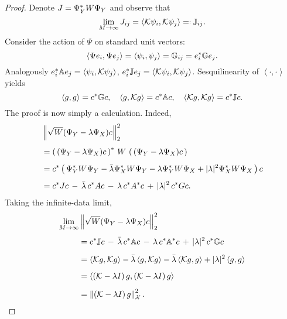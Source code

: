 \begin{proof}
    Denote $J = \Psi_Y^* W \Psi_Y$ and observe that
    \begin{equation}
        \label{eq:J}
        \lim_{M \to \infty} J_{i j} = 
        \left\langle \scrK \psi_i, \scrK \psi_j \right\rangle \eqdef \bbJ_{i j} . 
    \end{equation}
    Consider the action of $\Psi$ on standard unit vectors:
    \begin{equation}
        \left\langle \Psi e_i, \Psi e_j \right\rangle 
        = \left\langle \psi_i, \psi_j \right\rangle 
        = \mathbb{G}_{i j} 
        = e_i^* \mathbb{G} e_j . 
    \end{equation}
    Analogously $e_i^* \mathbb{A} e_j = \left\langle \psi_i, \mathcal{K} \psi_j \right\rangle$, 
    $e_i^* \mathbb{J} e_j = \left\langle \mathcal{K} \psi_i, \mathcal{K} \psi_j \right\rangle$. 
    Sesquilinearity of $\left\langle \cdot, \cdot \right\rangle$ yields 
    \begin{equation}
        \left\langle g, g \right\rangle = c^* \mathbb{G} c, \quad 
        \left\langle g, \mathcal{K} g \right\rangle = c^* \mathbb{A} c, \quad 
        \left\langle \mathcal{K} g, \mathcal{K} g \right\rangle = c^* \mathbb{J} c . 
    \end{equation}
    The proof is now simply a calculation. Indeed,
    \begin{equation}
        \begin{split}
            &\left\| \sqrt{W} ( \Psi_Y - \lambda \Psi_X ) c \right\|_2^2 \\[1ex]
            &= \left(\, ( \Psi_Y - \lambda \Psi_X ) c \,\right)^* \,W\, \left(\, ( \Psi_Y - \lambda \Psi_X ) c \,\right) \\[1ex]
            &= c^* \left(\, 
                \Psi_Y^* W \Psi_Y - \bar{\lambda} \Psi_X^* W \Psi_Y - \lambda \Psi_Y^* W \Psi_X + | \lambda |^2 \Psi_X^* W \Psi_X \,\right) c \\[1ex]
            &= c^* J c \,-\, \bar{\lambda}\, c^* A c \,-\, \lambda\, c^* A^* c \,+\, | \lambda |^2\, c^* G c . 
        \end{split}
    \end{equation}
    Taking the infinite-data limit,
    \begin{equation}
        \begin{split}
            \lim_{M \to \infty} & \left\| \sqrt{W} ( \Psi_Y - \lambda \Psi_X ) c \right\|_2^2 \\[1ex]
            &= c^* \mathbb{J} c \,-\, \bar{\lambda} \,c^* \mathbb{A} c \,-\, \lambda\, c^* \mathbb{A}^* c \,+\, | \lambda |^2\, c^* \mathbb{G} c \\[1.2ex]
            &= \left\langle \mathcal{K} g, \mathcal{K} g \right\rangle
            - \bar{\lambda} \left\langle g, \mathcal{K} g \right\rangle
            - \bar{\lambda} \left\langle \mathcal{K} g, g \right\rangle
            + | \lambda |^2 \left\langle g, g \right\rangle \\[1.2ex]
            &= \left\langle \left( \mathcal{K} - \lambda I \right) g, 
            \left( \mathcal{K} - \lambda I \right) g \right\rangle \\[1.2ex]
            &= \left\| \left( \mathcal{K} - \lambda I \right) g \right\|_{\mathcal{X}}^2 . 
        \end{split}
    \end{equation}
\end{proof}

